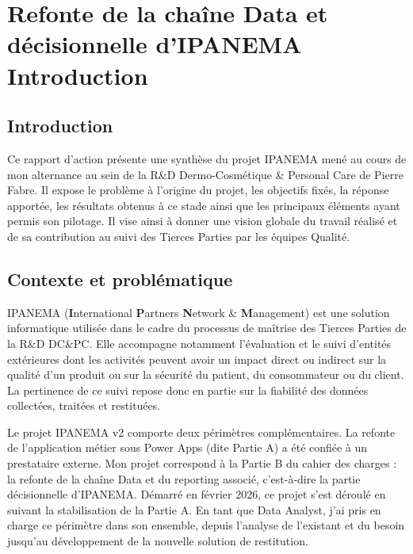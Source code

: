 \chapter{ Refonte de la chaîne Data et décisionnelle d'IPANEMA Introduction  }
\minitoc
\label{chap1}
\newpage
\section{Introduction}
\label{sec11}
Ce rapport d'action présente une synthèse du projet IPANEMA mené au cours de mon 
alternance au sein de la R\&D Dermo-Cosmétique \& Personal Care de Pierre Fabre. Il expose 
le problème à l'origine du projet, les objectifs fixés, la réponse apportée, les résultats obtenus 
à ce stade ainsi que les principaux éléments ayant permis son pilotage. Il vise ainsi à donner 
une vision globale du travail réalisé et de sa contribution au suivi des Tierces Parties par les 
équipes Qualité.


\section{Contexte et problématique}
\label{sec13}
IPANEMA (\textbf{I}nternational \textbf{P}artners \textbf{N}etwork \& \textbf{M}anagement) est une solution 
informatique utilisée dans le cadre du processus de maîtrise des Tierces Parties de la R\&D 
DC\&PC. Elle accompagne notamment l'évaluation et le suivi d'entités extérieures dont les 
activités peuvent avoir un impact direct ou indirect sur la qualité d'un produit ou sur la sécurité 
du patient, du consommateur ou du client. La pertinence de ce suivi repose donc en partie sur 
la fiabilité des données collectées, traitées et restituées. 

Le projet IPANEMA v2 comporte deux périmètres complémentaires. La refonte de 
l'application métier sous Power Apps (dite Partie A) a été confiée à un prestataire externe. 
Mon projet correspond à la Partie B du cahier des charges : la refonte de la chaîne Data et du 
reporting associé, c'est-à-dire la partie décisionnelle d'IPANEMA. Démarré en février 2026, ce 
projet s'est déroulé en suivant la stabilisation de la Partie A. En tant que Data Analyst, j'ai pris 
en charge ce périmètre dans son ensemble, depuis l'analyse de l'existant et du besoin jusqu'au 
développement de la nouvelle solution de restitution. 

